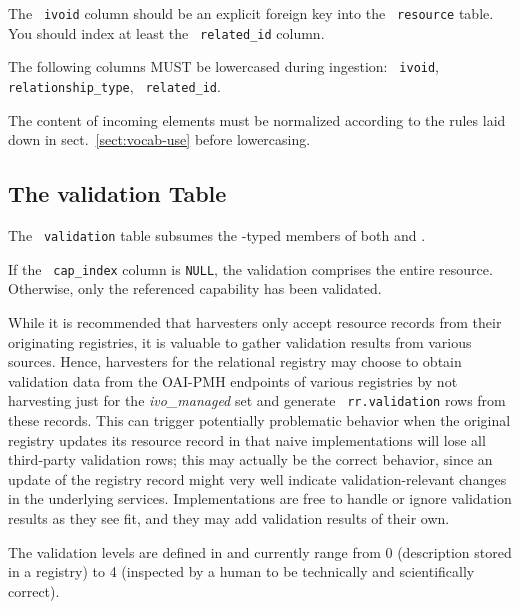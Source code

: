 \documentclass[11pt,a4paper]{ivoa}
\newcommand{\rtent}[1]{\texttt{\color{rtcolor} #1}}
\begin{document}

 

The \rtent{ivoid} column should be an explicit foreign key into the
\rtent{resource} table.  You should index at least the
\rtent{related\_id} column.

The following columns MUST be lowercased during ingestion:
\rtent{ivoid}, \rtent{relationship\_type},
\rtent{related\_id}.

The content of incoming 
elements must be normalized according to the rules laid down in
sect.~\ref{sect:vocab-use} before lowercasing.


\subsection{The validation Table}

\label{table_validation}

The \rtent{validation} table subsumes the
-typed members of both 
and .

If the \rtent{cap\_index} column is \texttt{NULL}, the
validation comprises the entire resource.  Otherwise, only the
referenced capability has been validated.

While it is recommended that harvesters only accept resource records
from their originating registries, it is valuable to gather validation
results from various sources.  Hence, harvesters for the relational
registry may choose to obtain validation data from the OAI-PMH endpoints
of various registries by not harvesting just for the \emph{ivo\_managed} set and
generate \rtent{rr.validation} rows from these records.  This can
trigger potentially problematic behavior when the original registry
updates  its resource record in that naive implementations will lose all
third-party validation rows; this may actually be the correct behavior,
since an update of the registry record might very well indicate
validation-relevant changes in the underlying services.  Implementations
are free to handle or ignore validation results as they see fit, and
they may add validation results of their own.

The validation levels are defined in \citet{std:RM} and
currently range from 0 (description stored in a registry) to 
4 (inspected by a human to be technically and scientifically
correct).


\end{document}
